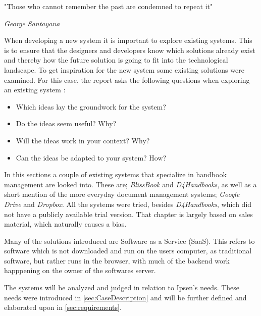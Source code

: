 \epigraph{"Those who cannot remember the past are condemned to repeat it"}{\textit{George Santayana}}
When developing a new system it is important to explore existing systems.
This is to ensure that the designers and developers know which solutions already exist and thereby how the future solution is going to fit into the technological landscape.
To get inspiration for the new system some existing solutions were examined.
For this case, the report asks the following questions when exploring an existing system \citep[p.~33]{Rod-Aalborg}:

\begin{itemize}
  \item Which ideas lay the groundwork for the system?
  \item Do the ideas seem useful? Why?
  \item Will the ideas work in your context? Why?
  \item Can the ideas be adapted to your system? How?
\end{itemize}

In this sections a couple of existing systems that specialize in handbook management are looked into.
These are; \textit{BlissBook} and \textit{D4Handbooks}, as well as a short mention of the more everyday document management systems; \textit{Google Drive} and \textit{Dropbox}.
All the systems were tried, besides \textit{D4Handbooks}, which did not have a publicly available trial version. That chapter is largely based on sales material, which naturally causes a bias.

Many of the solutions introduced are Software as a Service (SaaS).
This refers to software which is not downloaded and run on the users computer, as traditional software, but rather runs in the browser, with much of the backend work happpening on the owner of the softwares server. %

The systems will be analyzed and judged in relation to Ipsen's needs.
These needs were introduced in \ref{sec:CaseDescription} and will be further defined and elaborated upon in \ref{sec:requirements}.
